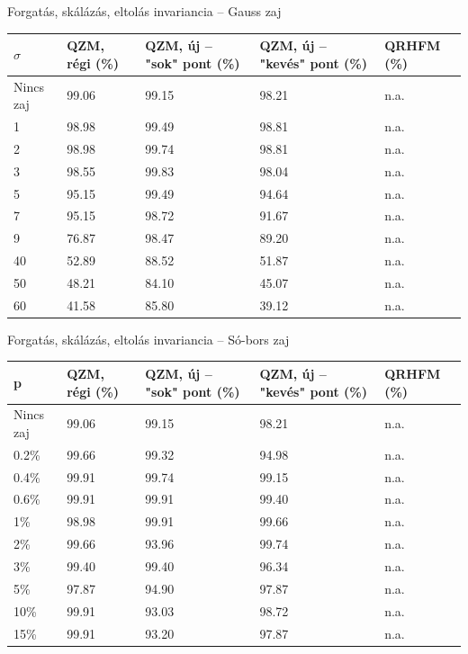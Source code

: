 \documentclass{beamer}
\begin{document}
\begin{frame}{Forgatás, skálázás, eltolás invariancia -- Gauss zaj}
    \vskip 1cm
    \begin{table}[tbp]
        \centering
\begin{tabular}{|p{1.5cm}|p{1.5cm}|p{2cm}|p{2.1cm}|p{1.5cm}|} \hline
    $\sigma$ & \textbf{QZM, régi} (\%) & \textbf{QZM, új} -- "sok" pont (\%)& \textbf{QZM, új} -- "kevés" pont (\%) & \textbf{QRHFM} (\%) \\ \hline\hline
            Nincs zaj & 99.06 & 99.15 & 98.21 & n.a. \\ \hline
            1 & 98.98 & 99.49 & 98.81 & n.a. \\ \hline
            2 & 98.98 & 99.74 & 98.81 & n.a. \\ \hline
            3 & 98.55 & 99.83 & 98.04 & n.a. \\ \hline
            5 & 95.15 & 99.49 & 94.64 & n.a. \\ \hline
            7 & 95.15 & 98.72 & 91.67 & n.a. \\ \hline
            9 & 76.87 & 98.47 & 89.20 & n.a. \\ \hline
            40 & 52.89 & 88.52 & 51.87 & n.a. \\ \hline
            50 & 48.21 & 84.10 & 45.07 & n.a. \\ \hline
            60 & 41.58 & 85.80 & 39.12 & n.a. \\ \hline
        \end{tabular}
    \end{table}
\end{frame}

\begin{frame}{Forgatás, skálázás, eltolás invariancia -- Só-bors zaj}
    \vskip 1cm
    \begin{table}[tbp]
        \centering
        \begin{tabular}{|p{1.5cm}|p{1.5cm}|p{2cm}|p{2.1cm}|p{1.5cm}|} \hline
            p & \textbf{QZM, régi} (\%) & \textbf{QZM, új} -- "sok" pont (\%)& \textbf{QZM, új} -- "kevés" pont (\%) & \textbf{QRHFM} (\%) \\ \hline\hline
            Nincs zaj & 99.06 & 99.15 & 98.21 & n.a. \\ \hline
            0.2\% & 99.66 & 99.32 & 94.98 & n.a.  \\ \hline
            0.4\% & 99.91 & 99.74 & 99.15 & n.a. \\ \hline
            0.6\% & 99.91 & 99.91 & 99.40 & n.a. \\ \hline
            1\% & 98.98 & 99.91 & 99.66 & n.a. \\ \hline
            2\% & 99.66 & 93.96 & 99.74 & n.a. \\ \hline
            3\% & 99.40 & 99.40 & 96.34 & n.a. \\ \hline
            5\% & 97.87 & 94.90 & 97.87 & n.a. \\ \hline
            10\% & 99.91 & 93.03 & 98.72 & n.a. \\ \hline
            15\% & 99.91 & 93.20 & 97.87 & n.a. \\ \hline
        \end{tabular}
    \end{table}
\end{frame}
\end{document}
